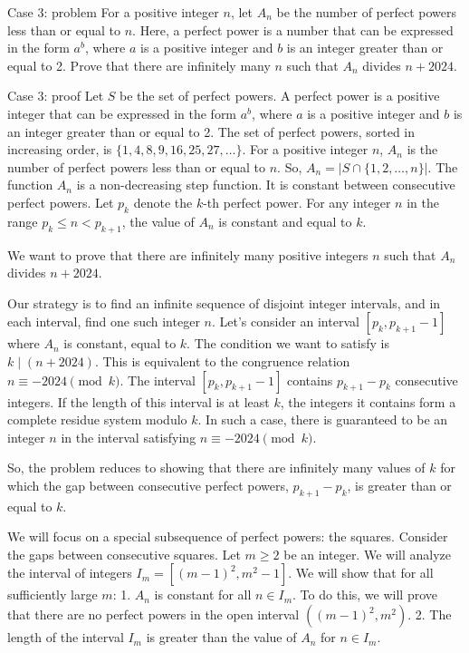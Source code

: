 \documentclass{article} %
\begin{document}
\begin{promptbox}{Case 3: problem}
For a positive integer $n$, let $A_{n}$ be the number of perfect powers less than or equal to $n$. Here, a perfect power is a number that can be expressed in the form $a^{b}$, where $a$ is a positive integer and $b$ is an integer greater than or equal to 2. Prove that there are infinitely many $n$ such that $A_{n}$ divides $n+2024$.
\end{promptbox}
\begin{promptbox}{Case 3: proof}
Let $S$ be the set of perfect powers. A perfect power is a positive integer that can be expressed in the form $a^b$, where $a$ is a positive integer and $b$ is an integer greater than or equal to 2. The set of perfect powers, sorted in increasing order, is $\{1, 4, 8, 9, 16, 25, 27, \dots\}$.
For a positive integer $n$, $A_n$ is the number of perfect powers less than or equal to $n$. So, $A_n = |S \cap \{1, 2, \dots, n\}|$.
The function $A_n$ is a non-decreasing step function. It is constant between consecutive perfect powers. Let $p_k$ denote the $k$-th perfect power. For any integer $n$ in the range $p_k \le n < p_{k+1}$, the value of $A_n$ is constant and equal to $k$.

We want to prove that there are infinitely many positive integers $n$ such that $A_n$ divides $n+2024$.

Our strategy is to find an infinite sequence of disjoint integer intervals, and in each interval, find one such integer $n$.
Let's consider an interval $[p_k, p_{k+1}-1]$ where $A_n$ is constant, equal to $k$. The condition we want to satisfy is $k \mid (n+2024)$. This is equivalent to the congruence relation $n \equiv -2024 \pmod{k}$.
The interval $[p_k, p_{k+1}-1]$ contains $p_{k+1}-p_k$ consecutive integers. If the length of this interval is at least $k$, the integers it contains form a complete residue system modulo $k$. In such a case, there is guaranteed to be an integer $n$ in the interval satisfying $n \equiv -2024 \pmod{k}$.

So, the problem reduces to showing that there are infinitely many values of $k$ for which the gap between consecutive perfect powers, $p_{k+1}-p_k$, is greater than or equal to $k$.

We will focus on a special subsequence of perfect powers: the squares. Consider the gaps between consecutive squares. Let $m \ge 2$ be an integer. We will analyze the interval of integers $I_m = [(m-1)^2, m^2-1]$. We will show that for all sufficiently large $m$:
1.  $A_n$ is constant for all $n \in I_m$. To do this, we will prove that there are no perfect powers in the open interval $((m-1)^2, m^2)$.
2.  The length of the interval $I_m$ is greater than the value of $A_n$ for $n \in I_m$.


\end{promptbox}
\end{document}
